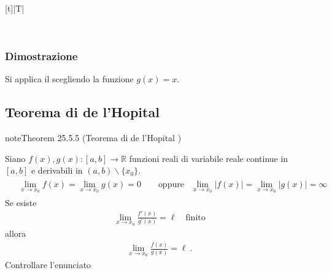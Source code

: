 \documentclass[letterpaper,10pt,italian]{jupyterBook}
\begin{document}
\begin{savenotes}\sphinxattablestart
\centering
\begin{tabulary}{\linewidth}[t]{|T|}
\hline

\sphinxAtStartPar
{}
\\
\hline
\end{tabulary}
\par
\sphinxattableend\end{savenotes}
\subsubsection*{Dimostrazione}

\sphinxAtStartPar
Si applica il {\hyperref[\detokenize{ch/infinitesimal_calculus/derivatives:infinitesimal-calculus-derivatives-thm-lagrange}]{}} scegliendo la funzione \(g(x) = x\).


\subsection{Teorema di de l’Hopital}
\label{\detokenize{ch/infinitesimal_calculus/derivatives:teorema-di-de-l-hopital}}\label{\detokenize{ch/infinitesimal_calculus/derivatives:infinitesimal-calculus-derivatives-thm-hopital}}\label{ch/infinitesimal_calculus/derivatives:thm:infinitesimal-calculus:derivatives:thm:hopital}
\begin{sphinxadmonition}{note}{Theorem 25.5.5 (Teorema di de l’Hopital )}



\sphinxAtStartPar
Siano \(f(x), g(x): [a,b] \rightarrow \mathbb{R}\) funzioni reali di variabile reale continue in \([a,b]\) e derivabili in \((a,b) \backslash \{ x_0 \}\).
\begin{equation*}
\begin{split}\begin{aligned}
  & \lim_{x \rightarrow x_0} f(x) = \lim_{x \rightarrow x_0} g(x) = 0 \qquad \text{oppure}
  & \lim_{x \rightarrow x_0}|f(x)|= \lim_{x \rightarrow x_0}|g(x)|= \infty
\end{aligned}\end{split}
\end{equation*}
\sphinxAtStartPar
Se esiste
\begin{equation*}
\begin{split} \lim_{x \rightarrow x_0} \frac{f'(x)}{g'(x)} = \ell \quad \text{finito}\end{split}
\end{equation*}
\sphinxAtStartPar
allora
\begin{equation*}
\begin{split} \lim_{x \rightarrow x_0} \frac{f(x)}{g(x)} = \ell \ . \end{split}
\end{equation*}
\sphinxAtStartPar
{} Controllare l’enunciato
\end{sphinxadmonition}
\end{document}
